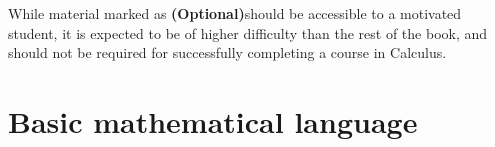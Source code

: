 \documentclass[12pt]{book}
\newcommand{\eqdef}{\textbf{:=}}
\newcommand{\optionalMaterial}{\textbf{(Optional)}}
\begin{document}
While material marked as \optionalMaterial should be accessible to a motivated student, it is expected to be of higher difficulty than the rest of the book, and should not be required for successfully completing a course in Calculus.



\chapter{Basic mathematical language}
\end{document}
